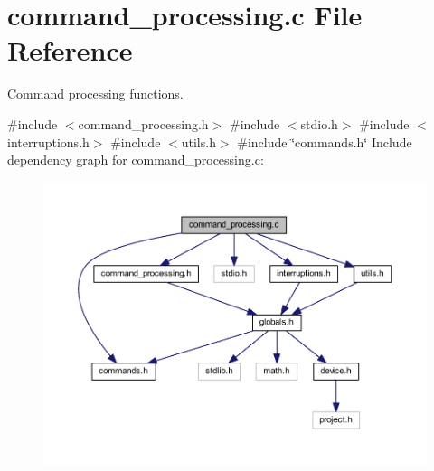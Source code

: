 \section{command\+\_\+processing.\+c File Reference}
\label{command__processing_8c}


Command processing functions.  


{\ttfamily \#include $<$command\+\_\+processing.\+h$>$}\newline
{\ttfamily \#include $<$stdio.\+h$>$}\newline
{\ttfamily \#include $<$interruptions.\+h$>$}\newline
{\ttfamily \#include $<$utils.\+h$>$}\newline
{\ttfamily \#include \char`\"{}commands.\+h\char`\"{}}\newline
Include dependency graph for command\+\_\+processing.\+c\+:\nopagebreak
\begin{figure}[H]
\begin{center}
\leavevmode
\includegraphics[width=350pt]{command__processing_8c__incl}
\end{center}
\end{figure}

